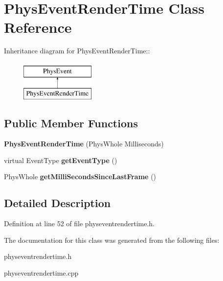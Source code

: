 \hypertarget{classPhysEventRenderTime}{
\section{PhysEventRenderTime Class Reference}
\label{d4/d83/classPhysEventRenderTime}
}
Inheritance diagram for PhysEventRenderTime::\begin{figure}[H]
\begin{center}
\leavevmode
\includegraphics[height=2cm]{d4/d83/classPhysEventRenderTime}
\end{center}
\end{figure}
\subsection*{Public Member Functions}
\begin{DoxyCompactItemize}
\item 
\hypertarget{classPhysEventRenderTime_af6ad859225b0c869af9145844ac5a248}{
{\bfseries PhysEventRenderTime} (PhysWhole Milliseconds)}
\label{d4/d83/classPhysEventRenderTime_af6ad859225b0c869af9145844ac5a248}

\item 
\hypertarget{classPhysEventRenderTime_a1aaa4ad9b56c0ab71b7efc7520d06357}{
virtual EventType {\bfseries getEventType} ()}
\label{d4/d83/classPhysEventRenderTime_a1aaa4ad9b56c0ab71b7efc7520d06357}

\item 
\hypertarget{classPhysEventRenderTime_aaba6aa77d58877dc8b3784c1ebcfe7b6}{
PhysWhole {\bfseries getMilliSecondsSinceLastFrame} ()}
\label{d4/d83/classPhysEventRenderTime_aaba6aa77d58877dc8b3784c1ebcfe7b6}

\end{DoxyCompactItemize}


\subsection{Detailed Description}


Definition at line 52 of file physeventrendertime.h.

The documentation for this class was generated from the following files:\begin{DoxyCompactItemize}
\item 
physeventrendertime.h\item 
physeventrendertime.cpp\end{DoxyCompactItemize}
